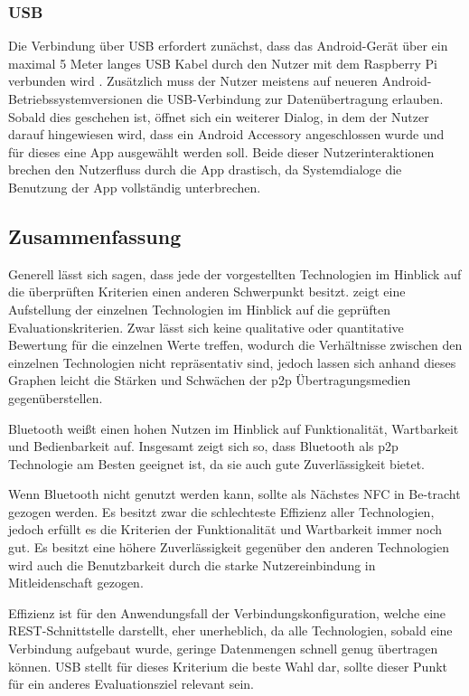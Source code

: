            \subsubsection{USB} Die Verbindung über USB erfordert zunächst, dass das Android-Gerät über ein \linebreak maximal 5 Meter langes USB Kabel durch den Nutzer mit dem Raspberry Pi verbunden wird \cite[S.22]{Kelm}. Zusätzlich muss der Nutzer meistens auf neueren Android-Betriebssystemversionen die USB-Verbindung zur Datenübertragung erlauben. Sobald dies geschehen ist, öffnet sich ein weiterer Dialog, in dem der Nutzer darauf hingewiesen wird, dass ein Android Accessory angeschlossen wurde und für dieses  eine App ausgewählt werden soll. Beide dieser Nutzerinteraktionen brechen den Nutzerfluss durch die App drastisch, da Systemdialoge die Benutzung der App vollständig unterbrechen.
		
		\subsection{Zusammenfassung}
		Generell lässt sich sagen, dass jede der vorgestellten Technologien im Hinblick auf die überprüften Kriterien einen anderen Schwerpunkt besitzt.  zeigt eine Aufstellung der einzelnen Technologien im Hinblick auf die geprüften Evaluationskriterien. Zwar lässt sich keine qualitative oder quantitative Bewertung für die einzelnen Werte treffen, wodurch die Verhältnisse zwischen den einzelnen Technologien nicht repräsentativ sind, jedoch lassen sich anhand dieses Graphen leicht die Stärken und Schwächen der p2p Übertragungsmedien gegenüberstellen.
		
		Bluetooth weißt einen hohen Nutzen im Hinblick auf Funktionalität, Wartbarkeit und Bedienbarkeit auf. Insgesamt zeigt sich so, dass Bluetooth als p2p Technologie am Besten geeignet ist, da sie auch gute Zuverlässigkeit bietet.
		
		Wenn Bluetooth nicht genutzt werden kann, sollte als Nächstes NFC in Be-tracht gezogen werden. Es besitzt zwar die schlechteste Effizienz aller Technologien, jedoch erfüllt es die Kriterien der Funktionalität und Wartbarkeit immer noch gut. Es besitzt eine höhere Zuverlässigkeit gegenüber den anderen Technologien wird auch die Benutzbarkeit durch die starke Nutzereinbindung in Mitleidenschaft gezogen.
		
		Effizienz ist für den Anwendungsfall der Verbindungskonfiguration, welche eine REST-Schnittstelle darstellt, eher unerheblich, da alle Technologien, sobald eine Verbindung aufgebaut wurde, geringe Datenmengen schnell genug übertragen können. USB stellt für dieses Kriterium die beste Wahl dar, sollte dieser Punkt für ein anderes Evaluationsziel relevant sein.
		

